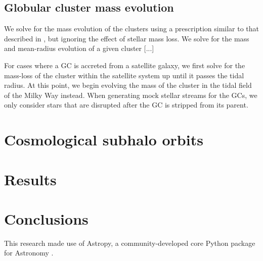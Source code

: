 \documentclass[manuscript, letterpaper]{aastex6}
\begin{document}
\subsection{Globular cluster mass evolution} \label{sec:gcmassevolution}

We solve for the mass evolution of the clusters using a prescription similar to
that described in \citet{Gnedin:2014}, but ignoring the effect of stellar mass
loss.
We solve for the mass and mean-radius evolution of a given cluster [...]

For cases where a GC is accreted from a satellite galaxy, we first solve for
the mass-loss of the cluster within the satellite system up until it passes the
tidal radius.
At this point, we begin evolving the mass of the cluster in the tidal field of
the Milky Way instead.
When generating mock stellar streams for the GCs, we only consider stars that
are disrupted after the GC is stripped from its parent.

\section{Cosmological subhalo orbits} \label{sec:aqorbits}

\section{Results}

\subsection{}

\section{Conclusions}\label{sec:conclusions}

\acknowledgements
This research made use of
Astropy, a community-developed core Python package for Astronomy
\citep{Astropy-Collaboration:2013}.



\end{document}
